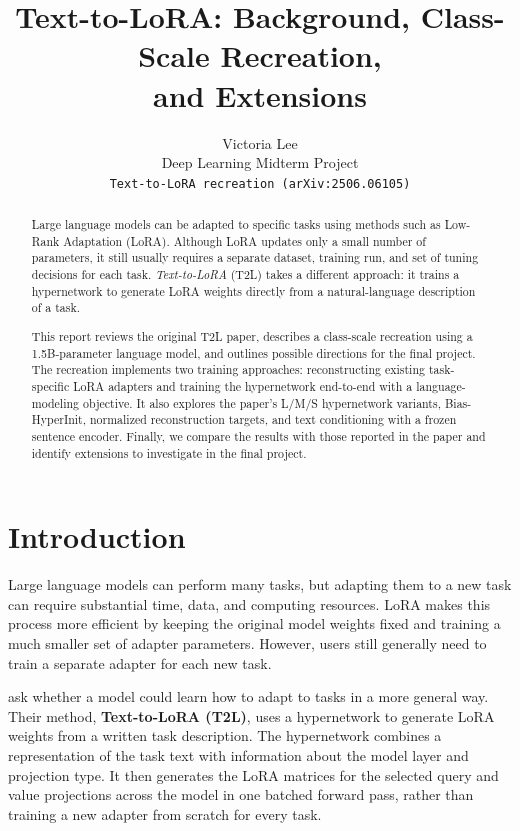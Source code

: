 \documentclass{article}
\title{Text-to-LoRA: Background, Class-Scale Recreation,\\and Extensions}
\author{
  Victoria Lee \\
  Deep Learning Midterm Project \\
  \texttt{Text-to-LoRA recreation (arXiv:2506.06105)}
}
\begin{document}
\maketitle

\begin{abstract}
Large language models can be adapted to specific tasks using methods such as Low-Rank Adaptation (LoRA). Although LoRA updates only a small number of parameters, it still usually requires a separate dataset, training run, and set of tuning decisions for each task. \textit{Text-to-LoRA} (T2L) takes a different approach: it trains a hypernetwork to generate LoRA weights directly from a natural-language description of a task.

This report reviews the original T2L paper, describes a class-scale recreation using a 1.5B-parameter language model, and outlines possible directions for the final project. The recreation implements two training approaches: reconstructing existing task-specific LoRA adapters and training the hypernetwork end-to-end with a language-modeling objective. It also explores the paper's L/M/S hypernetwork variants, Bias-HyperInit, normalized reconstruction targets, and text conditioning with a frozen sentence encoder. Finally, we compare the results with those reported in the paper and identify extensions to investigate in the final project. 

\end{abstract}

\section{Introduction}

Large language models can perform many tasks, but adapting them to a new task can require substantial time, data, and computing resources. LoRA \cite{hu2022lora} makes this process more efficient by keeping the original model weights fixed and training a much smaller set of adapter parameters. However, users still generally need to train a separate adapter for each new task.

\cite{charakorn2025texttolora} ask whether a model could learn how to adapt to tasks in a more general way. Their method, \textbf{Text-to-LoRA (T2L)}, uses a hypernetwork \cite{ha2016hypernetworks} to generate LoRA weights from a written task description. The hypernetwork combines a representation of the task text with information about the model layer and projection type. It then generates the LoRA matrices for the selected query and value projections across the model in one batched forward pass, rather than training a new adapter from scratch for every task.
\end{document}
